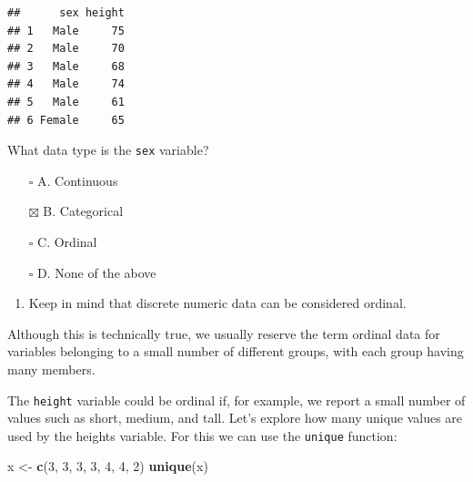 \documentclass[
]{article}
\newenvironment{Shaded}{\begin{snugshade}}{\end{snugshade}}
\newcommand{\DecValTok}[1]{\textcolor[rgb]{0.00,0.00,0.81}{#1}}
\newcommand{\KeywordTok}[1]{\textcolor[rgb]{0.13,0.29,0.53}{\textbf{#1}}}
\newcommand{\NormalTok}[1]{#1}
\newcommand{\OperatorTok}[1]{\textcolor[rgb]{0.81,0.36,0.00}{\textbf{#1}}}
\newcommand{\StringTok}[1]{\textcolor[rgb]{0.31,0.60,0.02}{#1}}
\providecommand{\tightlist}{%
  \setlength{\itemsep}{0pt}\setlength{\parskip}{0pt}}
\begin{document}
\begin{verbatim}
##      sex height
## 1   Male     75
## 2   Male     70
## 3   Male     68
## 4   Male     74
## 5   Male     61
## 6 Female     65
\end{verbatim}

What data type is the \texttt{sex} variable?

\begin{itemize}
\tightlist
\item[$\square$]
  A. Continuous
\item[$\boxtimes$]
  B. Categorical
\item[$\square$]
  C. Ordinal
\item[$\square$]
  D. None of the above
\end{itemize}

\begin{enumerate}
\def\labelenumi{\arabic{enumi}.}
\setcounter{enumi}{2}
\tightlist
\item
  Keep in mind that discrete numeric data can be considered ordinal.
\end{enumerate}

Although this is technically true, we usually reserve the term ordinal
data for variables belonging to a small number of different groups, with
each group having many members.

The \texttt{height} variable could be ordinal if, for example, we report
a small number of values such as short, medium, and tall. Let's explore
how many unique values are used by the heights variable. For this we can
use the \texttt{unique} function:

\begin{Shaded}
\begin{Highlighting}[]
\NormalTok{x <-}\StringTok{ }\KeywordTok{c}\NormalTok{(}\DecValTok{3}\NormalTok{, }\DecValTok{3}\NormalTok{, }\DecValTok{3}\NormalTok{, }\DecValTok{3}\NormalTok{, }\DecValTok{4}\NormalTok{, }\DecValTok{4}\NormalTok{, }\DecValTok{2}\NormalTok{)}
\KeywordTok{unique}\NormalTok{(x)}
\end{Highlighting}
\end{Shaded}

\begin{Shaded}
\end{Shaded}
\end{document}
